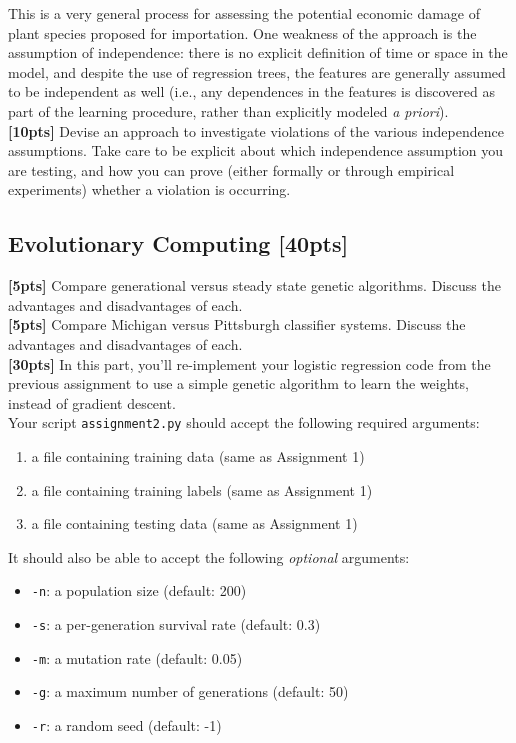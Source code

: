 \documentclass[paper=a4, fontsize=11pt]{scrartcl} %
\numberwithin{figure}{section} %
\numberwithin{table}{section} %
\begin{document}
This is a very general process for assessing the potential economic damage of plant species proposed for importation. One weakness of the approach is the assumption of independence: there is no explicit definition of time or space in the model, and despite the use of regression trees, the features are generally assumed to be independent as well (i.e., any dependences in the features is discovered as part of the learning procedure, rather than explicitly modeled \emph{a priori}). \\

\textbf{[10pts]} Devise an approach to investigate violations of the various independence assumptions. Take care to be explicit about which independence assumption you are testing, and how you can prove (either formally or through empirical experiments) whether a violation is occurring.

\subsection{Evolutionary Computing \textbf{[40pts]}}

\textbf{[5pts]} Compare generational versus steady state genetic algorithms. Discuss the advantages and disadvantages of each. \\

\textbf{[5pts]} Compare Michigan versus Pittsburgh classifier systems. Discuss the advantages and disadvantages of each. \\

\textbf{[30pts]} In this part, you'll re-implement your logistic regression code from the previous assignment to use a simple genetic algorithm to learn the weights, instead of gradient descent. \\

Your script \texttt{assignment2.py} should accept the following required arguments:

\begin{enumerate}
	\item a file containing training data (same as Assignment 1)
	\item a file containing training labels (same as Assignment 1)
	\item a file containing testing data (same as Assignment 1)
\end{enumerate}

It should also be able to accept the following \emph{optional} arguments:

\begin{itemize}
	\item \texttt{-n}: a population size (default: 200)
	\item \texttt{-s}: a per-generation survival rate (default: 0.3)
	\item \texttt{-m}: a mutation rate (default: 0.05)
	\item \texttt{-g}: a maximum number of generations (default: 50)
	\item \texttt{-r}: a random seed (default: -1)
\end{itemize}
\end{document}
